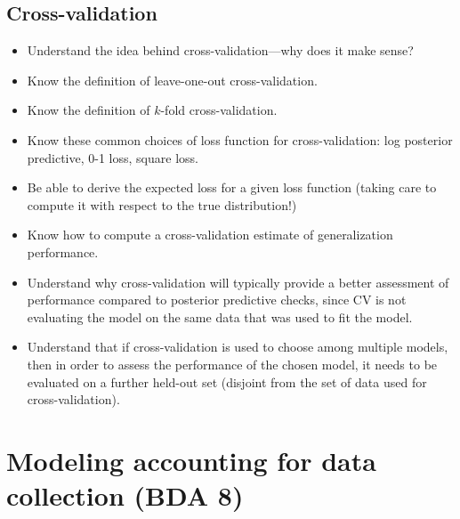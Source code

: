 \documentclass[12pt]{article}
\begin{document}
\subsection{Cross-validation}
\begin{itemize}
\item Understand the idea behind cross-validation---why does it make sense?
\item Know the definition of leave-one-out cross-validation.
\item Know the definition of $k$-fold cross-validation.
\item Know these common choices of loss function for cross-validation: log posterior predictive, 0-1 loss, square loss.
\item Be able to derive the expected loss for a given loss function (taking care to compute it with respect to the true distribution!)
\item Know how to compute a cross-validation estimate of generalization performance.
\item Understand why cross-validation will typically provide a better assessment of performance compared to posterior predictive checks, since CV is not evaluating the model on the same data that was used to fit the model.
\item Understand that if cross-validation is used to choose among multiple models, then in order to assess the performance of the chosen model, it needs to be evaluated on a further held-out set (disjoint from the set of data used for cross-validation).
\end{itemize}


\section{Modeling accounting for data collection (BDA 8)}
\end{document}
